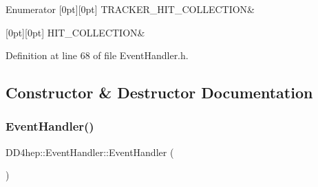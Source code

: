 \begin{DoxyEnumFields}{Enumerator}
[0pt][0pt]{}\hypertarget{class_d_d4hep_1_1_event_handler_a0b22a141a019364495835317fad48254a157b5d4bcda403c48a5cb368d8671761}{}\label{class_d_d4hep_1_1_event_handler_a0b22a141a019364495835317fad48254a157b5d4bcda403c48a5cb368d8671761} 
T\+R\+A\+C\+K\+E\+R\+\_\+\+H\+I\+T\+\_\+\+C\+O\+L\+L\+E\+C\+T\+I\+ON&\\
\hline

[0pt][0pt]{}\hypertarget{class_d_d4hep_1_1_event_handler_a0b22a141a019364495835317fad48254acaedbfda8dbee1f6ab8d296b875dcb07}{}\label{class_d_d4hep_1_1_event_handler_a0b22a141a019364495835317fad48254acaedbfda8dbee1f6ab8d296b875dcb07} 
H\+I\+T\+\_\+\+C\+O\+L\+L\+E\+C\+T\+I\+ON&\\
\hline

\end{DoxyEnumFields}


Definition at line 68 of file Event\+Handler.\+h.



\subsection{Constructor \& Destructor Documentation}
\hypertarget{class_d_d4hep_1_1_event_handler_a83e36ed405cced9a1dab7414b2e0fe05}{}\label{class_d_d4hep_1_1_event_handler_a83e36ed405cced9a1dab7414b2e0fe05} 
\subsubsection{\texorpdfstring{Event\+Handler()}{EventHandler()}}
{\footnotesize\ttfamily D\+D4hep\+::\+Event\+Handler\+::\+Event\+Handler (\begin{DoxyParamCaption}{ }\end{DoxyParamCaption})}




